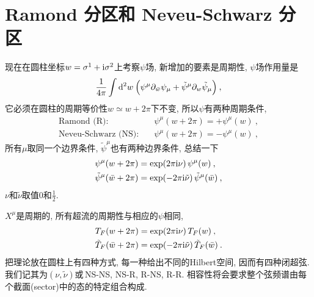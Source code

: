 \section{Ramond 分区和 Neveu-Schwarz 分区}
现在在圆柱坐标$ w=\sigma^{1}+\mathrm{i}\sigma^{2}$上考察$ \psi $场, 新增加的要素是周期性, $\psi $场作用量是
\begin{equation}
    \frac{1}{4\pi}\int \mathrm{d}^{2} w\: \Bigl(\psi^{\mu}\partial_{\bar{w}}\psi_{\mu}
    +\tilde{\psi}^{\mu}\partial_{w}\tilde{\psi}_{\mu} \Bigr) \:, \label{10.2.1}
\end{equation}
它必须在圆柱的周期等价性$ w\simeq w+2\pi$下不变, 所以$ \psi $有两种周期条件,
\begin{subequations}
\begin{align}
    \text{Ramond (R)}:&\quad \psi^{\mu}(w+2\pi)= +\psi^{\mu}(w) \:, \label{10.2.2a} \\
    \text{Neveu-Schwarz (NS)}:&\quad \psi^{\mu}(w+2\pi)=-\psi^{\mu}(w) \:, \label{10.2.2b}
\end{align}    
\end{subequations}
所有$ \mu $取同一个边界条件, $ \tilde{\psi}^{\mu} $也有两种边界条件, 总结一下
\begin{subequations}
\begin{align}
    \psi^{\mu}(w+2\pi) &= \exp(2\pi\mathrm{i}\nu)\, \psi^{\mu}(w) \:, \label{10.2.3a} \\
    \tilde{\psi}^{\mu}(\bar{w}+2\pi)&= \exp(-2\pi\mathrm{i}\tilde{\nu})\,\tilde{\psi}^{\mu}(\bar{w}) \:, \label{10.2.3b} 
\end{align}
\end{subequations}
$\nu $和$ \tilde{\nu} $取值$ 0 $和$ \frac{1}{2}$.

$X^{\mu} $是周期的, 所有超流的周期性与相应的$ \psi $相同,
\begin{subequations}
\begin{align}
    T_{F}(w+2\pi) &= \exp(2\pi\mathrm{i}\nu)\,T_{F}(w) \:, \label{10.2.4a}\\
    \tilde{T}_{F}(\bar{w}+2\pi) &= \exp(-2\pi\mathrm{i}\tilde{\nu})\,\tilde{T}_{F}(\bar{w})\:. \label{10.2.4b}
\end{align}  \label{10.2.4}
\end{subequations}
把理论放在圆柱上有四种方式, 每一种给出不同的Hilbert空间, 因而有四种闭超弦. 我们记其为$(\nu,\tilde{\nu})$或\,NS-NS, NS-R, R-NS, R-R. 相容性将会要求整个弦频谱由每个截面(sector)中的态的特定组合构成.

